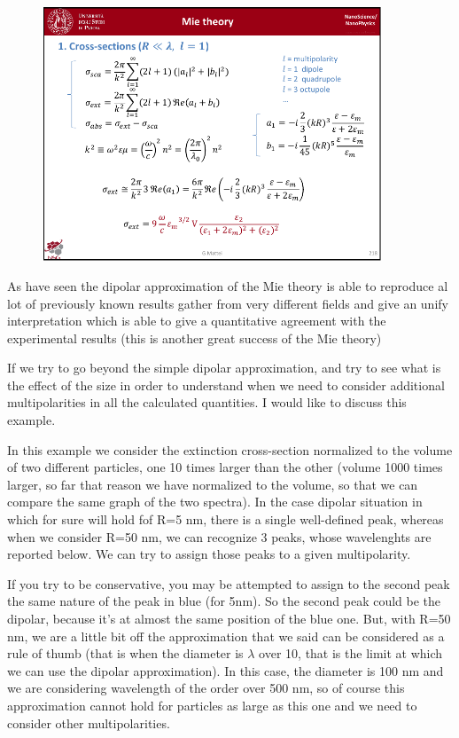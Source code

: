 \documentclass[../main/main.tex]{subfiles}
\begin{document}
\begin{figure}[h!]
\centering
\includegraphics[page=6,width=0.9\textwidth]{../lessons/pdf_file/14_lesson.pdf}
\end{figure}

As have seen the dipolar approximation of the Mie theory is able to reproduce al lot of previously known results gather from very different fields and give an unify interpretation which is able to give a quantitative agreement with the experimental results (this is another great success of the Mie theory)

If we try to go beyond the simple dipolar approximation, and try to see what is the effect of the size in order to understand when we need to consider additional multipolarities in all the calculated quantities. I would like to discuss this example.

In this example we consider the extinction cross-section normalized to the volume of two different particles, one 10 times larger than the other (volume 1000 times larger, so far that reason we have normalized to the volume, so that we can compare the same graph of the two spectra).
In the case dipolar situation in which for sure will hold fof R=5 nm, there is a single well-defined peak, whereas when we consider R=50 nm, we can recognize 3 peaks, whose wavelenghts are reported below.
We can try to assign those peaks to a given multipolarity.

If you try to be conservative, you may be attempted to assign to the second peak the same nature of the peak in blue (for 5nm). So the second peak could be the dipolar, because it’s at almost the same position of the blue one.
But, with R=50 nm, we are a little bit off the approximation that we said can be considered as a rule of thumb (that is when the diameter is $\lambda$ over 10, that is the limit at which we can use the dipolar approximation). In this case, the diameter is 100 nm and we are considering wavelength of the order over 500 nm, so of course this approximation cannot hold for particles as large as this one and we need to consider other multipolarities.
\end{document}

